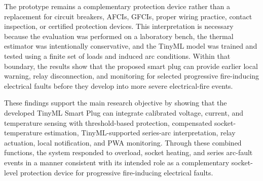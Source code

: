 The prototype remains a complementary protection device rather than a
replacement for circuit breakers, AFCIs, GFCIs, proper wiring practice,
contact inspection, or certified protection devices. This interpretation is
necessary because the evaluation was performed on a laboratory bench, the
thermal estimator was intentionally conservative, and the TinyML model was
trained and tested using a finite set of loads and induced arc conditions.
Within that boundary, the results show that the proposed smart plug can provide
earlier local warning, relay disconnection, and monitoring for selected
progressive fire-inducing electrical faults before they develop into more
severe electrical-fire events.

These findings support the main research objective by showing that the
developed TinyML Smart Plug can integrate calibrated voltage, current, and
temperature sensing with threshold-based protection, compensated
socket-temperature estimation, TinyML-supported series-arc interpretation,
relay actuation, local notification, and PWA monitoring. Through these
combined functions, the system responded to overload, socket heating, and series arc-fault events in a manner consistent with
its intended role as a complementary socket-level protection device for
progressive fire-inducing electrical faults.
